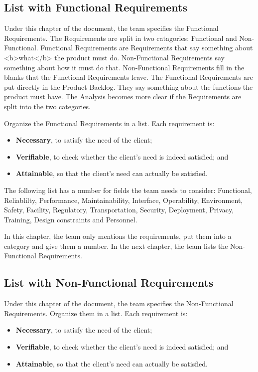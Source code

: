 \documentclass[10pt]{report}
\begin{document}
\subsection{List with Functional Requirements}

Under this chapter of the document, the team specifies the Functional Requirements. The Requirements are split in two catagories: Functional and Non-Functional. Functional Requirements are Requirements that say something about <b>what</b> the product must do. Non-Functional Requirements say something about how it must do that. Non-Functional Requirements fill in the blanks that the Functional Requirements leave. The Functional Requirements are put directly in the Product Backlog. They say something about the functions the product must have. The Analysis becomes more clear if the Requirements are split into the two categories.

Organize the Functional Requirements in a list. Each requirement is:

\begin{itemize}
	\item \textbf{Necessary}, to satisfy the need of the client;
	\item \textbf{Verifiable}, to check whether the client's need is indeed satisfied; and
	\item \textbf{Attainable}, so that the client's need can actually be satisfied. 
\end{itemize}

The following list has a number for fields the team needs to consider: Functional, Reliablilty, Performance, Maintainability, Interface, Operability, Environment, Safety, Facility, Regulatory, Transportation, Security, Deployment, Privacy, Training, Design constraints and Personnel.

In this chapter, the team only mentions the requirements, put them into a category and give them a number. In the next chapter, the team lists the Non-Functional Requirements.

\subsection{List with Non-Functional Requirements}

Under this chapter of the document, the team specifies the Non-Functional Requirements. Organize them in a list. Each requirement is:

\begin{itemize}
	\item \textbf{Necessary}, to satisfy the need of the client;
	\item \textbf{Verifiable}, to check whether the client's need is indeed satisfied; and
	\item \textbf{Attainable}, so that the client's need can actually be satisfied. 
\end{itemize}
\end{document}
